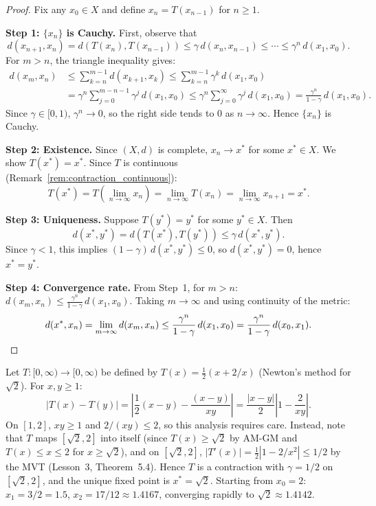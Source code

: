 \documentclass[11pt,a4paper]{article}
\begin{document}
\begin{proof}
Fix any $x_0 \in X$ and define $x_n = T(x_{n-1})$ for $n \ge 1$.

\textbf{Step 1: $\{x_n\}$ is Cauchy.} First, observe that
\[
  d(x_{n+1}, x_n) = d(T(x_n), T(x_{n-1}))
  \le \gamma\, d(x_n, x_{n-1}) \le \cdots \le \gamma^n\, d(x_1, x_0).
\]
For $m > n$, the triangle inequality gives:
\begin{align*}
  d(x_m, x_n)
  &\le \sum_{k=n}^{m-1} d(x_{k+1}, x_k)
  \le \sum_{k=n}^{m-1} \gamma^k\, d(x_1, x_0) \\
  &= \gamma^n \sum_{j=0}^{m-n-1} \gamma^j\, d(x_1, x_0)
  \le \gamma^n \sum_{j=0}^{\infty} \gamma^j\, d(x_1, x_0)
  = \frac{\gamma^n}{1 - \gamma}\, d(x_1, x_0).
\end{align*}
Since $\gamma \in [0, 1)$, $\gamma^n \to 0$, so the right side tends
to $0$ as $n \to \infty$. Hence $\{x_n\}$ is Cauchy.

\textbf{Step 2: Existence.} Since $(X, d)$ is complete, $x_n \to x^*$
for some $x^* \in X$. We show $T(x^*) = x^*$. Since $T$ is continuous
(Remark~\ref{rem:contraction_continuous}):
\[
  T(x^*) = T\left(\lim_{n \to \infty} x_n\right)
  = \lim_{n \to \infty} T(x_n) = \lim_{n \to \infty} x_{n+1} = x^*.
\]

\textbf{Step 3: Uniqueness.} Suppose $T(y^*) = y^*$ for some
$y^* \in X$. Then
\[
  d(x^*, y^*) = d(T(x^*), T(y^*)) \le \gamma\, d(x^*, y^*).
\]
Since $\gamma < 1$, this implies $(1 - \gamma)\, d(x^*, y^*) \le 0$,
so $d(x^*, y^*) = 0$, hence $x^* = y^*$.

\textbf{Step 4: Convergence rate.} From Step~1, for $m > n$:
$d(x_m, x_n) \le \frac{\gamma^n}{1 - \gamma}\, d(x_1, x_0)$.
Taking $m \to \infty$ and using continuity of the metric:
\[
  d(x^*, x_n) = \lim_{m \to \infty} d(x_m, x_n)
  \le \frac{\gamma^n}{1 - \gamma}\, d(x_1, x_0)
  = \frac{\gamma^n}{1 - \gamma}\, d(x_0, x_1). \qedhere
\]
\end{proof}

\begin{example}[Contraction on $\R$]
\label{ex:contraction_R}
Let $T \colon [0, \infty) \to [0, \infty)$ be defined by
$T(x) = \frac{1}{2}(x + 2/x)$ (Newton's method for $\sqrt{2}$). For
$x, y \ge 1$:
\[
  |T(x) - T(y)| = \left|\frac{1}{2}(x - y) - \frac{(x - y)}{xy}\right|
  = \frac{|x - y|}{2}\left|1 - \frac{2}{xy}\right|.
\]
On $[1, 2]$, $xy \ge 1$ and $2/(xy) \le 2$, so this analysis requires
care. Instead, note that $T$ maps $[\sqrt{2}, 2]$ into itself (since
$T(x) \ge \sqrt{2}$ by AM-GM and $T(x) \le x \le 2$ for
$x \ge \sqrt{2}$), and on $[\sqrt{2}, 2]$,
$|T'(x)| = \frac{1}{2}|1 - 2/x^2| \le 1/2$ by the MVT (Lesson~3,
Theorem~5.4). Hence $T$ is a contraction with $\gamma = 1/2$ on
$[\sqrt{2}, 2]$, and the unique fixed point is $x^* = \sqrt{2}$.
Starting from $x_0 = 2$: $x_1 = 3/2 = 1.5$, $x_2 = 17/12 \approx
1.4167$, converging rapidly to $\sqrt{2} \approx 1.4142$.
\end{example}
\end{document}
